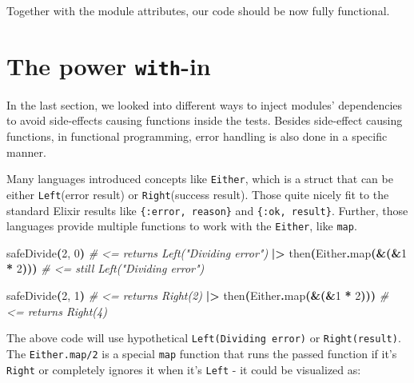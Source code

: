 \documentclass[
  oneside]{book}
\newenvironment{Shaded}{\begin{snugshade}}{\end{snugshade}}
\newcommand{\CommentTok}[1]{\textcolor[rgb]{0.56,0.35,0.01}{\textit{#1}}}
\newcommand{\ConstantTok}[1]{\textcolor[rgb]{0.56,0.35,0.01}{#1}}
\newcommand{\DecValTok}[1]{\textcolor[rgb]{0.00,0.00,0.81}{#1}}
\newcommand{\FunctionTok}[1]{\textcolor[rgb]{0.13,0.29,0.53}{\textbf{#1}}}
\newcommand{\NormalTok}[1]{#1}
\newcommand{\OperatorTok}[1]{\textcolor[rgb]{0.81,0.36,0.00}{\textbf{#1}}}
\begin{document}
Together with the module attributes, our code should be now fully functional.

\section{\texorpdfstring{The power \texttt{with}-in}{The power with-in}}\label{the-power-with-in}

In the last section, we looked into different ways to inject modules' dependencies to avoid side-effects causing functions inside the tests. Besides side-effect causing functions, in functional programming, error handling is also done in a specific manner.

Many languages introduced concepts like \texttt{Either}, which is a struct that can be either \texttt{Left}(error result) or \texttt{Right}(success result). Those quite nicely fit to the standard Elixir results like \texttt{\{:error,\ reason\}} and \texttt{\{:ok,\ result\}}. Further, those languages provide multiple functions to work with the \texttt{Either}, like \texttt{map}.

\begin{Shaded}
\begin{Highlighting}[]
\NormalTok{safeDivide}\FunctionTok{(}\DecValTok{2}\NormalTok{, }\DecValTok{0}\FunctionTok{)} \CommentTok{\# \textless{}= returns Left("Dividing error")}
\OperatorTok{|\textgreater{}}\NormalTok{ then}\FunctionTok{(}\ConstantTok{Either}\OperatorTok{.}\NormalTok{map}\FunctionTok{(}\OperatorTok{\&}\FunctionTok{(}\OperatorTok{\&}\DecValTok{1} \OperatorTok{*} \DecValTok{2}\FunctionTok{)))} \CommentTok{\# \textless{}= still Left("Dividing error")}

\NormalTok{safeDivide}\FunctionTok{(}\DecValTok{2}\NormalTok{, }\DecValTok{1}\FunctionTok{)} \CommentTok{\# \textless{}= returns Right(2)}
\OperatorTok{|\textgreater{}}\NormalTok{ then}\FunctionTok{(}\ConstantTok{Either}\OperatorTok{.}\NormalTok{map}\FunctionTok{(}\OperatorTok{\&}\FunctionTok{(}\OperatorTok{\&}\DecValTok{1} \OperatorTok{*} \DecValTok{2}\FunctionTok{)))} \CommentTok{\# \textless{}= returns Right(4)}
\end{Highlighting}
\end{Shaded}

The above code will use hypothetical \texttt{Left(\textquotesingle{}Dividing\ error\textquotesingle{})} or \texttt{Right(result)}. The \texttt{Either.map/2} is a special \texttt{map} function that runs the passed function if it's \texttt{Right} or completely ignores it when it's \texttt{Left} - it could be visualized as:
\end{document}
